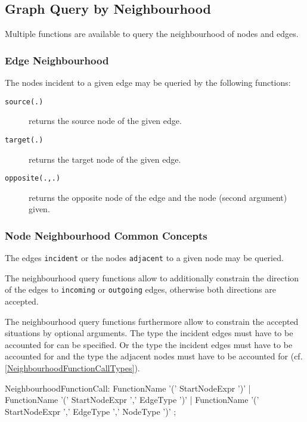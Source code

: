 \subsection{Graph Query by Neighbourhood}

Multiple functions are available to query the neighbourhood of nodes and edges.

\subsubsection*{Edge Neighbourhood}

The nodes incident to a given edge may be queried by the following functions: 

\begin{description}
\item[\texttt{source(.)}] returns the source node of the given edge.
\item[\texttt{target(.)}] returns the target node of the given edge.
\item[\texttt{opposite(.,.)}] returns the opposite node of the edge and the node (second argument) given.
\end{description}

\subsubsection*{Node Neighbourhood Common Concepts}

The edges \texttt{incident} or the nodes \texttt{adjacent} to a given node may be queried.

The neighbourhood query functions allow to additionally constrain the direction of the edges to \texttt{incoming} or \texttt{outgoing} edges, otherwise both directions are accepted.

The neighbourhood query functions furthermore allow to constrain the accepted situations by optional arguments. The type the incident edges must have to be accounted for can be specified. Or the type the incident edges must have to be accounted for and the type the adjacent nodes must have to be accounted for (cf. \ref{NeighbourhoodFunctionCallTypes}).

\begin{rail}
NeighbourhoodFunctionCall: 
  FunctionName '(' StartNodeExpr ')' |
  FunctionName '(' StartNodeExpr ',' EdgeType ')' |
  FunctionName '(' StartNodeExpr ',' EdgeType ',' NodeType ')'
  ;
\end{rail}\label{NeighbourhoodFunctionCallTypes}

